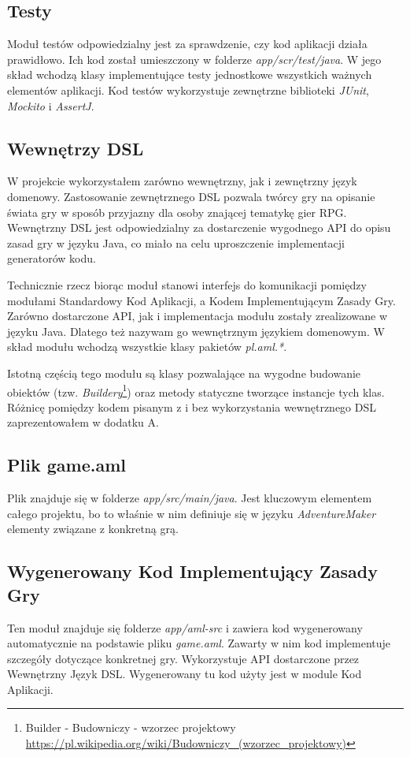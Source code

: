 \documentclass[openright]{xmgr}
\begin{document}
\subsection*{Testy}
Moduł testów odpowiedzialny jest za sprawdzenie, czy kod aplikacji działa prawidłowo. Ich  kod został umieszczony w folderze \textit{app/scr/test/java}. W jego skład wchodzą klasy implementujące testy jednostkowe wszystkich ważnych elementów aplikacji. Kod testów wykorzystuje zewnętrzne biblioteki \textit{JUnit}, \textit{Mockito} i \textit{AssertJ}.

\subsection*{Wewnętrzy DSL}

W projekcie wykorzystałem zarówno wewnętrzny, jak i zewnętrzny język domenowy. Zastosowanie zewnętrznego DSL pozwala twórcy gry na opisanie świata gry w sposób przyjazny dla osoby znającej tematykę gier RPG.  Wewnętrzny DSL jest odpowiedzialny za dostarczenie wygodnego API do opisu zasad gry w języku Java, co miało na celu uproszczenie implementacji generatorów kodu.

Technicznie rzecz biorąc moduł stanowi interfejs do komunikacji pomiędzy modułami Standardowy Kod Aplikacji, a Kodem Implementującym Zasady Gry. Zarówno dostarczone API, jak i implementacja modułu zostały zrealizowane w języku Java. Dlatego też nazywam go wewnętrznym językiem domenowym. W skład modułu wchodzą wszystkie klasy pakietów \textit{pl.aml.*}.

Istotną częścią tego modułu są klasy pozwalające na wygodne budowanie obiektów (tzw. \textit{Buildery}\footnote{Builder - Budowniczy  - wzorzec projektowy  \url{https://pl.wikipedia.org/wiki/Budowniczy_(wzorzec_projektowy)}}) oraz metody statyczne tworzące instancje tych klas. Różnicę pomiędzy kodem pisanym z i bez wykorzystania wewnętrznego DSL zaprezentowałem w dodatku A.

\subsection*{Plik game.aml}
Plik znajduje się w folderze \textit{app/src/main/java}. Jest kluczowym elementem całego projektu, bo to właśnie w nim definiuje się w języku \textit{AdventureMaker} elementy związane z konkretną grą.

\subsection*{Wygenerowany Kod Implementujący Zasady Gry}
Ten moduł znajduje się folderze \textit{app/aml-src} i zawiera kod wygenerowany automatycznie na podstawie pliku \textit{game.aml}. Zawarty w nim kod implementuje szczegóły dotyczące konkretnej gry. Wykorzystuje API dostarczone przez Wewnętrzny Język DSL. Wygenerowany tu kod użyty jest w module Kod Aplikacji.
\end{document}
